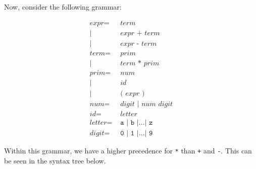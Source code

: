 \documentclass[a4paper, openany]{memoir}
\begin{document}
Now, consider the following grammar:
\begin{figure}[H]
    \centering
    \begin{align*}
        \textit{expr} =& \textit{  term} \\
        |\hspace{2pt} & \textit{ expr } \texttt{+} \textit{ term} \\
        |\hspace{2pt} & \textit{ expr } \texttt{-} \textit{ term} \\
        \textit{term} =& \textit{ prim} \\
        |\hspace{2pt} & \textit{ term } \texttt{*} \textit{ prim} \\
        \textit{prim} =& \textit{ num} \\
        |\hspace{2pt} & \textit{ id} \\
        |\hspace{2pt} & \texttt{ (} \textit{ expr } \texttt{)} \\
        \textit{num} =& \textit{ digit } | \textit{ num digit} \\
        \textit{id} =& \textit{ letter} \\
        \textit{letter} =& \texttt{ a } | \texttt{ b } | \dots | \texttt{ z} \\
        \textit{digit} =& \texttt{ 0 } | \texttt{ 1 } | \dots | \texttt{ 9}
    \end{align*}
\end{figure}
\noindent Within this grammar, we have a higher precedence for \texttt{*} than \texttt{+} and \texttt{-}. This can be seen in the syntax tree below.
\end{document}
